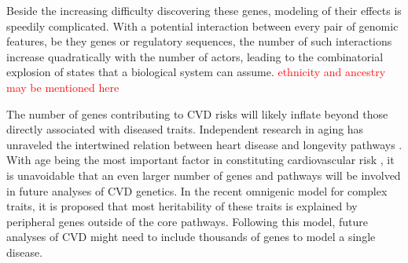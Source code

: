 \documentclass[letter]{bioinfo}
\newcommand{\comment}[1]{\textcolor{red}{#1}}
\begin{document}
Beside the increasing difficulty discovering these genes, modeling of their effects is speedily complicated. With a potential interaction between every pair of genomic features, be they genes or regulatory sequences, the number of such interactions increase quadratically with the number of actors, leading to the combinatorial explosion of states that a biological system can assume. \comment{ethnicity and ancestry may be mentioned here}

The number of genes contributing to CVD risks will likely inflate beyond those directly associated with diseased traits. Independent research in aging has unraveled the intertwined relation between heart disease and longevity pathways \citep{North:2012:Intersection}.  With age being the most important factor in constituting cardiovascular risk \citep{Steenman:2017:Cardiac}, it is unavoidable that an even larger number of genes and pathways will be involved in future analyses of CVD genetics. In the recent omnigenic model for complex traits, it is proposed that most heritability of these traits is explained by peripheral genes outside of the core pathways. Following this model, future analyses of CVD might need to include thousands of genes to model a single disease.



\end{document}
